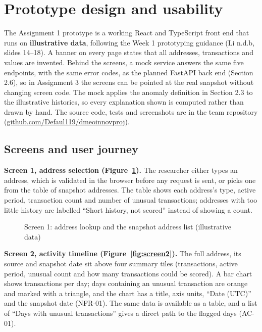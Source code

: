\section{Prototype design and usability}
\label{sec:prototype}

The Assignment 1 prototype is a working React and TypeScript front end that runs on \textbf{illustrative data}, following the Week 1 prototyping guidance (Li n.d.b, slides 14–18). A banner on every page states that all addresses, transactions and values are invented. Behind the screens, a mock service answers the same five endpoints, with the same error codes, as the planned FastAPI back end (Section 2.6), so in Assignment 3 the screens can be pointed at the real snapshot without changing screen code. The mock applies the anomaly definition in Section 2.3 to the illustrative histories, so every explanation shown is computed rather than drawn by hand. The source code, tests and screenshots are in the team repository (\href{https://github.com/Defaul119/dmeoinnovproj}{github.com/Defaul119/dmeoinnovproj}).

\subsection{Screens and user journey}
\label{sec:screens}

\textbf{Screen 1, address selection (Figure~\ref{fig:screen1}).} The researcher either types an address, which is validated in the browser before any request is sent, or picks one from the table of snapshot addresses. The table shows each address's type, active period, transaction count and number of unusual transactions; addresses with too little history are labelled “Short history, not scored” instead of showing a count.

\begin{figure}[htbp]
  \centering
  \caption{Screen 1: address lookup and the snapshot address list (illustrative data)}
  \label{fig:screen1}
\end{figure}

\textbf{Screen 2, activity timeline (Figure~\ref{fig:screen2}).} The full address, its source and snapshot date sit above four summary tiles (transactions, active period, unusual count and how many transactions could be scored). A bar chart shows transactions per day; days containing an unusual transaction are orange and marked with a triangle, and the chart has a title, axis units, “Date (UTC)” and the snapshot date (NFR-01). The same data is available as a table, and a list of “Days with unusual transactions” gives a direct path to the flagged days (AC-01).

